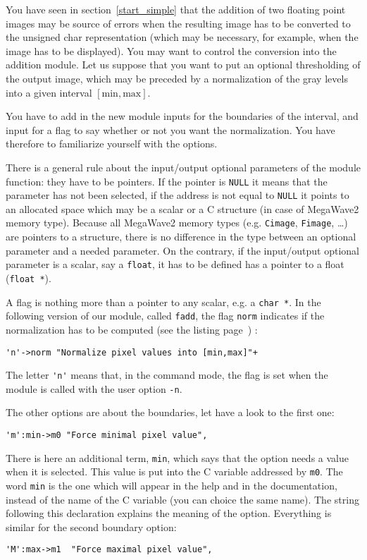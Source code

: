 You have seen in section~\ref{start_simple} that the addition of two floating point images 
may be source of errors when the resulting image has to be converted to the unsigned char 
representation (which may be necessary, for example, when the image has to be displayed).
You may want to control the conversion into the addition module.
Let us suppose that you want to put an optional thresholding of the output image, which may be preceded by a normalization of the gray levels into a given interval $[\mbox{min},\mbox{max}]$.

You have to add in the new module inputs for the boundaries of the interval, and input
for a flag to say whether or not you want the normalization. 
You have therefore to familiarize yourself with the options.

There is a general rule about the input/output optional parameters of the module function:
they have to be pointers. 
If the pointer is \verb+NULL+ it means that the parameter has not been selected,
if the address is not equal to \verb+NULL+ it points to an allocated space which may be a scalar or a C structure (in case of MegaWave2 memory type).
Because all MegaWave2 memory types (e.g. \verb+Cimage+, \verb+Fimage+, \ldots) are pointers to a structure, there is no difference in the type between an optional parameter and a needed parameter.
On the contrary, if the input/output optional parameter is a scalar, say a \verb+float+,
it has to be defined has a pointer to a float (\verb+float *+).

A flag is nothing more than a pointer to any scalar, e.g. a \verb+char *+.
In the following version of our module, called \verb+fadd+, the flag \verb+norm+ 
indicates if the normalization has to be computed (see the listing page~\pageref{listing_fadd}) : 
\begin{verbatim}
'n'->norm "Normalize pixel values into [min,max]"+
\end{verbatim}
The letter \verb+'n'+ means that, in the command mode, the flag is set when the module
is called with the user option \verb+-n+.

The other options are about the boundaries, let have a look to the first one:
\begin{verbatim}
'm':min->m0 "Force minimal pixel value",
\end{verbatim}
There is here an additional term, \verb+min+, which says that the option needs a value
when it is selected. 
This value is put into the C variable addressed by \verb+m0+.
The word \verb+min+ is the one which will appear in the help and in the documentation,
instead of the name of the C variable (you can choice the same name).
The string following this declaration explains the meaning of the option.
Everything is similar for the second boundary option:
\begin{verbatim}
'M':max->m1  "Force maximal pixel value",
\end{verbatim}

